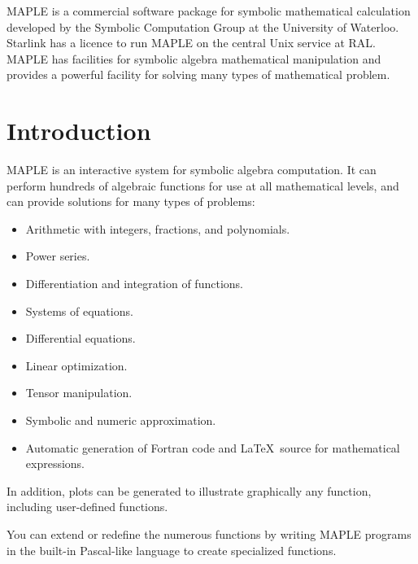 \documentclass[twoside,11pt]{article}
\newcommand{\stardocinitials}  {SUN}
\newcommand{\stardocnumber}    {107.4}
\newcommand{\stardocabstract}  {%

MAPLE is a commercial software package for symbolic mathematical
calculation developed by the Symbolic Computation Group at the
University of Waterloo.  Starlink has a licence to run MAPLE on the
central Unix service at RAL. MAPLE has facilities for symbolic algebra
mathematical manipulation and provides a powerful facility for solving
many types of mathematical problem.

}
\newcommand{\stardocname}{\stardocinitials /\stardocnumber}
\newenvironment{latexonly}{}{}
\newcommand{\xlabel}[1]{}
\newcommand{\latexonlytoc}[0]{\tableofcontents}
\renewcommand{\thepage}{\roman{page}}
\begin{document}
\stardocabstract
  \newpage
  \begin{latexonly}
    \setlength{\parskip}{0mm}
    \latexonlytoc
    \setlength{\parskip}{\medskipamount}
    \markboth{\stardocname}{\stardocname}
  \end{latexonly}
\cleardoublepage
\renewcommand{\thepage}{\arabic{page}}
\setcounter{page}{1}


\section{Introduction\xlabel{introduction}}

MAPLE is an interactive system for symbolic algebra computation. It can
perform hundreds of algebraic functions for use at all mathematical
levels, and can provide solutions for many types of problems:

\begin{itemize}
\item Arithmetic with integers, fractions, and polynomials.
\item Power series.
\item Differentiation and integration of functions.
\item Systems of equations.
\item Differential equations.
\item Linear optimization.
\item Tensor manipulation.
\item Symbolic and numeric approximation.
\item Automatic generation of Fortran code and \LaTeX\ source for mathematical
expressions.
\end{itemize}

In addition, plots can be generated to illustrate graphically any
function, including user-defined functions.

You can extend or redefine the numerous functions by writing MAPLE
programs in the built-in Pascal-like language to create specialized
functions.
\end{document}
